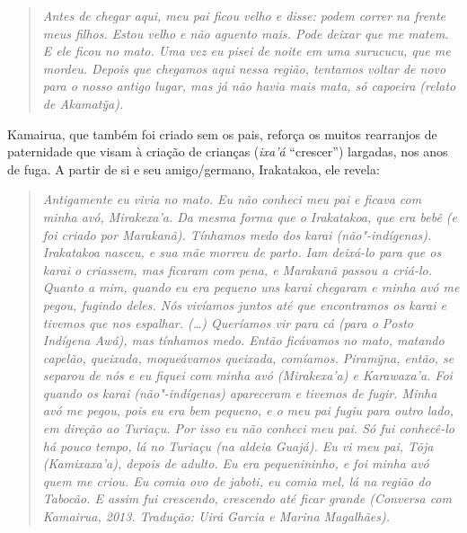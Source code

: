 \begin{quote}
\emph{Antes de chegar aqui, meu pai ficou velho e disse: podem correr
na frente meus filhos. Estou velho e não aguento mais. Pode deixar que
me matem. E ele ficou no mato. Uma vez eu pisei de noite em uma
surucucu, que me mordeu. Depois que chegamos aqui nessa região, tentamos
voltar de novo para o nosso antigo lugar, mas já não havia mais mata, só
capoeira (relato de Akamatỹa).}
\end{quote}

Kamairua, que também foi criado sem os pais, reforça os muitos
rearranjos de paternidade que visam à criação de crianças (\emph{ixa'á}
``crescer'') largadas, nos anos de fuga. A partir de si e seu
amigo/germano, Irakatakoa, ele revela:

\begin{quote}
\emph{Antigamente eu vivia no mato. Eu não conheci meu pai e ficava
com minha avó, Mirakexa'a. Da mesma forma que o Irakatakoa, que era bebê
(e foi criado por Marakanã). Tínhamos medo dos karai (não"-indígenas).
Irakatakoa nasceu, e sua mãe morreu de parto. Iam deixá-lo para que os
karai o criassem, mas ficaram com pena, e Marakanã passou a criá-lo.
Quanto a mim, quando eu era pequeno uns karai chegaram e minha avó me
pegou, fugindo deles. Nós vivíamos juntos até que encontramos os karai e
tivemos que nos espalhar. (\ldots{}) Queríamos vir para cá (para o Posto
Indígena Awá), mas tínhamos medo. Então ficávamos no mato, matando
capelão, queixada, moqueávamos queixada, comíamos. Piramỹna, então, se
separou de nós e eu fiquei com minha avó (Mirakexa'a) e Karawaxa'a. Foi
quando os karai (não"-indígenas) apareceram e tivemos de fugir. Minha avó
me pegou, pois eu era bem pequeno, e o meu pai fugiu para outro lado, em
direção ao Turiaçu. Por isso eu não conheci meu pai. Só fui conhecê-lo
há pouco tempo, lá no Turiaçu (na aldeia Guajá). Eu vi meu pai, Tõja
(Kamixaxa'a), depois de adulto. Eu era pequenininho, e foi minha avó
quem me criou. Eu comia ovo de jaboti, eu comia mel, lá na região do
Tabocão. E assim fui crescendo, crescendo até ficar grande (Conversa
com Kamairua, 2013. Tradução: Uirá Garcia e Marina Magalhães).}
\end{quote}

